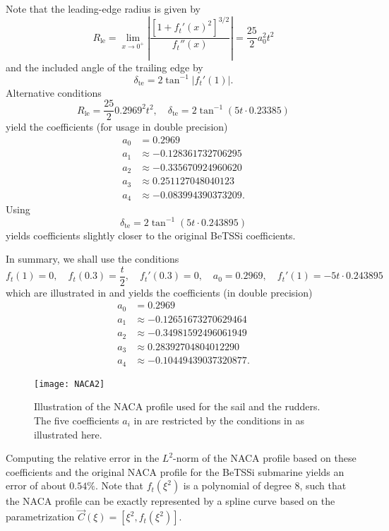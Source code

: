 Note that the leading-edge radius is given by
\begin{equation*}
	R_{\mathrm{le}} =\lim_{x\to 0^+} \left|\frac{\left[1+f_t'(x)^2\right]^{3/2}}{f_t''(x)}\right| =  \frac{25}{2}a_0^2t^2
\end{equation*}
and the included angle of the trailing edge by
\begin{equation*}
	\delta_{\mathrm{te}} = 2\tan^{-1}|f_t'(1)|.
\end{equation*}
Alternative conditions \cite{Cummings2015gfa}
\begin{equation}\label{Eq3:NACAconditions2}
	R_{\mathrm{le}} = \frac{25}{2}0.2969^2t^2,\quad \delta_{\mathrm{te}} = 2\tan^{-1}(5t\cdot 0.23385)
\end{equation}
yield the coefficients (for usage in double precision)
\begin{align*}
	a_0 &= 0.2969\\
	a_1 &\approx-0.128361732706295\\
	a_2 &\approx-0.335670924960620\\
	a_3 &\approx 0.251127048040123\\
	a_4 &\approx-0.083994390373209.
\end{align*}
Using
\begin{equation*}
	\delta_{\mathrm{te}} = 2\tan^{-1}(5t\cdot 0.243895)
\end{equation*}
yields coefficients slightly closer to the original BeTSSi coefficients.

In summary, we shall use the conditions
\begin{equation}\label{Eq3:NACAconditions3}
	f_t(1) = 0,\quad  f_t(0.3) = \frac{t}{2}, \quad f_t'(0.3) = 0,\quad a_0 = 0.2969,\quad f_t'(1) = -5 t\cdot 0.243895
\end{equation}
which are illustrated in  and yields the coefficients (in double precision)
\begin{align*}
	a_0 &= 0.2969\\
	a_1 &\approx-0.12651673270629464\\
	a_2 &\approx-0.34981592496061949\\
	a_3 &\approx 0.28392704804012290\\
	a_4 &\approx-0.10449439037320877.
\end{align*}

\begin{figure}
	\centering
	\texttt{[image: NACA2]}
	\caption{Illustration of the NACA profile used for the sail and the rudders. The five coefficients $a_i$ in  are restricted by the conditions in  as illustrated here.}
	\label{Fig3:NACA2}
\end{figure}
Computing the relative error in the $L^2$-norm of the NACA profile based on these coefficients and the original NACA profile for the BeTSSi submarine yields an error of about $0.54\%$. Note that $f_t(\xi^2)$ is a polynomial of degree 8, such that the NACA profile can be exactly represented by a spline curve based on the parametrization $\vec{C}(\xi) = [\xi^2,f_t(\xi^2)]$. 

